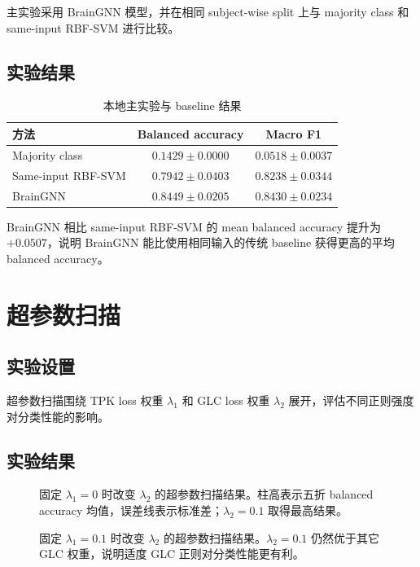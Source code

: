 主实验采用 BrainGNN 模型，并在相同 subject-wise split 上与 majority class 和 same-input RBF-SVM 进行比较。

\subsection{实验结果}

\begin{table}[H]
  \centering
  \caption{本地主实验与 baseline 结果}
  \begin{tabular}{lcc}
    \toprule
    方法 & Balanced accuracy & Macro F1 \\
    \midrule
    Majority class & $0.1429 \pm 0.0000$ & $0.0518 \pm 0.0037$ \\
    Same-input RBF-SVM & $0.7942 \pm 0.0403$ & $0.8238 \pm 0.0344$ \\
    BrainGNN & $0.8449 \pm 0.0205$ & $0.8430 \pm 0.0234$ \\
    \bottomrule
  \end{tabular}
\end{table}

BrainGNN 相比 same-input RBF-SVM 的 mean balanced accuracy 提升为 $+0.0507$，说明 BrainGNN 能比使用相同输入的传统 baseline 获得更高的平均 balanced accuracy。

\section{超参数扫描}

\subsection{实验设置}

超参数扫描围绕 TPK loss 权重 $\lambda_1$ 和 GLC loss 权重 $\lambda_2$ 展开，评估不同正则强度对分类性能的影响。

\subsection{实验结果}

\begin{figure}[H]
  \centering
  \caption{固定 $\lambda_1=0$ 时改变 $\lambda_2$ 的超参数扫描结果。柱高表示五折 balanced accuracy 均值，误差线表示标准差；$\lambda_2=0.1$ 取得最高结果。}
  \label{fig:hparam-lambda1-0}
\end{figure}

\begin{figure}[H]
  \centering
  \caption{固定 $\lambda_1=0.1$ 时改变 $\lambda_2$ 的超参数扫描结果。$\lambda_2=0.1$ 仍然优于其它 GLC 权重，说明适度 GLC 正则对分类性能更有利。}
  \label{fig:hparam-lambda1-01}
\end{figure}

